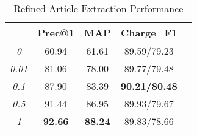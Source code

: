 
\begin{table}
\centering
\normalsize{
\begin{tabular}{|c|c|c|c|c|}
\hline
\bm{$\beta$}							& \textbf{Prec@1} 		& \textbf{MAP} 			& \textbf{Charge\_F1} \\
\hline
\textit{0} 								& 60.94								& 61.61 						& 89.59/79.23 	\\
\hline
\textit{0.01} 						& 81.06								& 78.00							& 89.77/79.48 	\\
\hline
\textit{0.1} 							& 87.90								& 83.39							& \textbf{90.21/80.48} 	\\
\hline
\textit{0.5} 							& 91.44								& 86.95							& 89.93/79.67 	\\
\hline
\textit{1} 								& \textbf{92.66}			& \textbf{88.24}		& 89.83/78.66 	\\
\hline
\end{tabular}
}
\caption{Refined Article Extraction Performance}
\label{tab_article_att}
\end{table}


